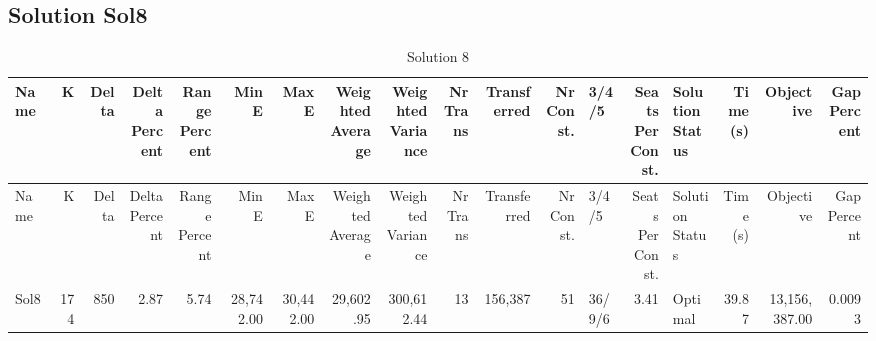 \documentclass[a4paper]{article}
\begin{document}
\clearpage
\subsection{Solution Sol8}

{\scriptsize
\begin{longtable}{lrrrrrrrrrrrlrlrrr}
\caption{Solution 8}
\\ \toprule
Name &K &Delta &\shortstack{Delta\\Percent} &\shortstack{Range\\Percent} &Min E &Max E &\shortstack{Weighted\\Average} &\shortstack{Weighted\\Variance} &\shortstack{Nr\\Trans} &Transferred &\shortstack{Nr\\Const.} &3/4/5 &\shortstack{Seats\\Per\\Const.} &\shortstack{Solution\\Status} &\shortstack{Time\\(s)} &Objective &\shortstack{Gap\\Percent} \\ \midrule
\endfirsthead
\toprule
Name &K &Delta &\shortstack{Delta\\Percent} &\shortstack{Range\\Percent} &Min E &Max E &\shortstack{Weighted\\Average} &\shortstack{Weighted\\Variance} &\shortstack{Nr\\Trans} &Transferred &\shortstack{Nr\\Const.} &3/4/5 &\shortstack{Seats\\Per\\Const.} &\shortstack{Solution\\Status} &\shortstack{Time\\(s)} &Objective &\shortstack{Gap\\Percent} \\ \midrule
\endhead
\bottomrule
\endfoot
Sol8&174&850& 2.87& 5.74&28,742.00&30,442.00&29,602.95&300,612.44&13&156,387&51&36/9/6& 3.41&Optimal&39.87&13,156,387.00&0.0093\\ 
\end{longtable}

}
\end{document}
